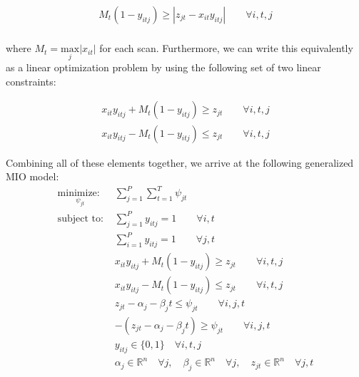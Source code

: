 \begin{align}
M_{t}(1-y_{itj}) \geq |z_{jt} - x_{it}y_{itj}| \qquad \forall i,t,j\\
\end{align}

where $M_{t} = \underset{j}{\text{max}}|x_{it}|$ for each scan. Furthermore, we can write this equivalently as a linear optimization problem by using the following set of two linear constraints:

\begin{align}
x_{it}y_{itj} + M_{t}(1-y_{itj}) \geq z_{jt} \qquad \forall i,t,j\\
x_{it}y_{itj} - M_{t}(1-y_{itj}) \leq z_{jt} \qquad \forall i,t,j
\end{align}

Combining all of these elements together, we arrive at the following generalized MIO model:
\begin{align*}
\underset{\psi_{jt}}{\text{minimize: }} & \sum_{j=1}^{P} \sum_{t=1}^{T} \psi_{jt} \\
\text{subject to: }	& \sum_{j=1}^{P} y_{itj} = 1 \qquad \forall i,t\\
				& \sum_{i=1}^{P} y_{itj} = 1 \qquad \forall j,t\\
				& x_{it}y_{itj} + M_{t}(1-y_{itj}) \geq z_{jt} \qquad \forall i,t,j\\
				& x_{it}y_{itj} - M_{t}(1-y_{itj}) \leq z_{jt} \qquad \forall i,t,j\\
				& z_{jt} - \alpha_{j} - \beta_{j}t \leq \psi_{jt} \qquad \forall i,j,t\\
				& -(z_{jt} - \alpha_{j} - \beta_{j}t) \geq \psi_{jt} \qquad \forall i,j,t\\
			 	& y_{itj} \in \{0,1\} \quad \forall i,t,j\\
				& \alpha_{j} \in \mathbb{R}^n \quad \forall j,\quad \beta_{j} \in \mathbb{R}^n \quad \forall j, \quad z_{jt} \in \mathbb{R}^n \quad \forall j,t
\end{align*}
